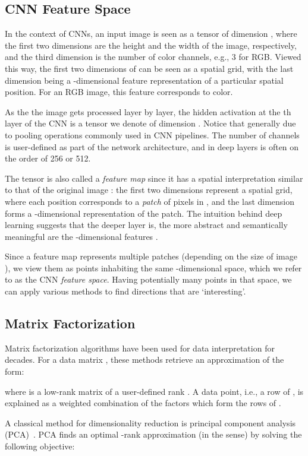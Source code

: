 \documentclass[runningheads]{llncs}
\begin{document}
	\subsection{CNN Feature Space}
	In the context of CNNs, an input image  is seen as a tensor of dimension , where the first two dimensions are the height and the width of the image, respectively, and the third dimension is the number of color channels, e.g., 3 for RGB. Viewed this way, the first two dimensions of  can be seen as a spatial grid, with the last dimension being a -dimensional feature representation of a particular spatial position. For an RGB image, this feature corresponds to color.
	
	As the the image gets processed layer by layer, the hidden activation at the th layer of the CNN is a tensor we denote  of dimension . Notice that generally  due to pooling operations commonly used in CNN pipelines. The number of channels  is user-defined as part of the network architecture, and in deep layers is often on the order of 256 or 512.
	
	The tensor  is also called a \emph{feature map} since it has a spatial interpretation similar to that of the original image : the first two dimensions represent a spatial grid, where each position corresponds to a \emph{patch} of pixels in , and the last dimension forms a -dimensional representation of the patch. The intuition behind deep learning suggests that the deeper layer  is, the more  abstract and semantically meaningful are the -dimensional features \cite{bengio2013representation}.
	
	Since a feature map represents multiple patches (depending on the size of image ), we view them as points inhabiting the same  -dimensional space, which we refer to as the CNN \emph{feature space}. Having potentially many points in that space, we can apply various methods to find directions that are `interesting'. 
	
	
	\subsection{Matrix Factorization}
	Matrix factorization algorithms have been used for data interpretation for decades. For a data matrix , these methods retrieve an approximation of the form:
	
	where  is a low-rank matrix of a user-defined rank . A data point, i.e., a row of , is explained as a weighted combination of the factors which form the rows of .
	
	A classical method for dimensionality reduction is principal component analysis (PCA)~\cite{jolliffe1986principal}.
	PCA finds an optimal -rank approximation (in the  sense) by solving the following objective:
	
\end{document}
